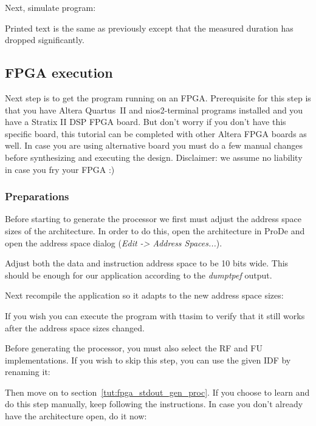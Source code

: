 \documentclass[twoside]{tceusermanual}
\begin{document}
Next, simulate program:


Printed text is the same as previously except that the measured duration
has dropped significantly.

\subsection{FPGA execution}

Next step is to get the program running on an FPGA. Prerequisite for
this step is that you have Altera Quartus~II and nios2-terminal
programs installed and you have a Stratix II DSP FPGA board. But don't
worry if you don't have this specific board, this tutorial can be
completed with other Altera FPGA boards as well. In case you are using
alternative board you must do a few manual changes before synthesizing and
executing the design. Disclaimer: we assume no liability in case you
fry your FPGA :)

\subsubsection{Preparations}

Before starting to generate the processor we first must adjust the
address space sizes of the architecture. In order to do this, open the
architecture in ProDe and open the address space dialog (\textit{Edit
  -> Address Spaces...}).


Adjust both the data and instruction address space to be 10 bits
wide. This should be enough for our application according to the
\textit{dumptpef} output.

Next recompile the application so it adapts to the new address space
sizes:


If you wish you can execute the program with ttasim to verify that it
still works after the address space sizes changed.

Before generating the processor, you must also select the RF and FU
implementations. If you wish to skip this step, you can use the given
IDF by renaming it: 


Then move on to section~\ref{tut:fpga_stdout_gen_proc}. If you choose
to learn and do this step manually, keep following the
instructions. In case you don't already have the architecture open, do
it now:
\end{document}
